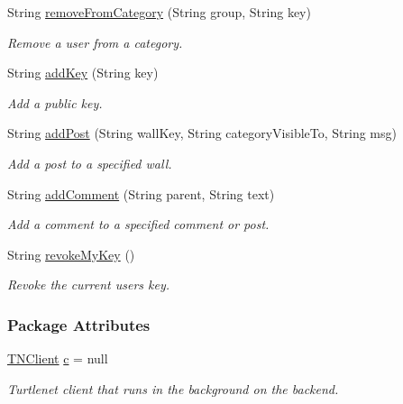 \begin{DoxyCompactItemize}
String \hyperlink{classballmerpeak_1_1turtlenet_1_1server_1_1TurtlenetImpl_ae8181f4e329a9ffa1d1b4d5deebf617d}{remove\-From\-Category} (String group, String key)
\begin{DoxyCompactList}\small\item\em Remove a user from a category. \end{DoxyCompactList}\item 
String \hyperlink{classballmerpeak_1_1turtlenet_1_1server_1_1TurtlenetImpl_ac32167a339c28603b6166f7dc605f6b8}{add\-Key} (String key)
\begin{DoxyCompactList}\small\item\em Add a public key. \end{DoxyCompactList}\item 
String \hyperlink{classballmerpeak_1_1turtlenet_1_1server_1_1TurtlenetImpl_ae66b52ba9debe2a2f06e6402d485526c}{add\-Post} (String wall\-Key, String category\-Visible\-To, String msg)
\begin{DoxyCompactList}\small\item\em Add a post to a specified wall. \end{DoxyCompactList}\item 
String \hyperlink{classballmerpeak_1_1turtlenet_1_1server_1_1TurtlenetImpl_a0a6b4c30111bf1c85613b2370c20f464}{add\-Comment} (String parent, String text)
\begin{DoxyCompactList}\small\item\em Add a comment to a specified comment or post. \end{DoxyCompactList}\item 
String \hyperlink{classballmerpeak_1_1turtlenet_1_1server_1_1TurtlenetImpl_a2f380c86cd6789269b156b3a731834ae}{revoke\-My\-Key} ()
\begin{DoxyCompactList}\small\item\em Revoke the current users key. \end{DoxyCompactList}\end{DoxyCompactItemize}
\subsubsection*{Package Attributes}
\begin{DoxyCompactItemize}
\item 
\hypertarget{classballmerpeak_1_1turtlenet_1_1server_1_1TurtlenetImpl_a8e8797ccc45aa68a72f8349c4eaf84ca}{\hyperlink{classballmerpeak_1_1turtlenet_1_1server_1_1TNClient}{T\-N\-Client} \hyperlink{classballmerpeak_1_1turtlenet_1_1server_1_1TurtlenetImpl_a8e8797ccc45aa68a72f8349c4eaf84ca}{c} = null}\label{classballmerpeak_1_1turtlenet_1_1server_1_1TurtlenetImpl_a8e8797ccc45aa68a72f8349c4eaf84ca}

\begin{DoxyCompactList}\small\item\em Turtlenet client that runs in the background on the backend. \end{DoxyCompactList}\end{DoxyCompactItemize}


